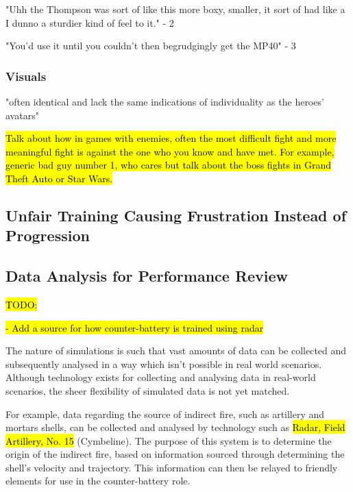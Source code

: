 \documentclass{article}
\begin{document}
"Uhh the Thompson was sort of like this more boxy, smaller, it sort of had like a I dunno a sturdier kind of feel to it." - 2

"You'd use it until you couldn't then begrudgingly get the MP40" - 3

\subsubsection{Visuals}

"often identical and lack the same indications of individuality as
the heroes’ avatars"

\hl{Talk about how in games with enemies, often the most difficult fight and more meaningful fight is against the one who you know and have met.
For example, generic bad guy number 1, who cares but talk about the boss fights in Grand Theft Auto or Star Wars.}



\subsection{Unfair Training Causing Frustration Instead of Progression}


\subsection{Data Analysis for Performance Review}

\hl{TODO:} 

\hl{- Add a source for how counter-battery is trained using radar}

The nature of simulations is such that vast amounts of data can be collected and subsequently analysed in a way which isn't possible in real world scenarios. Although technology exists for collecting and analysing data in real-world scenarios, the sheer flexibility of simulated data is not yet matched.

For example, data regarding the source of indirect fire, such as artillery and mortars shells, can be collected and analysed by technology such as \hl{Radar, Field Artillery, No. 15} (Cymbeline). The purpose of this system is to determine the origin of the indirect fire, based on information sourced through determining the shell's velocity and trajectory. This information can then be relayed to friendly elements for use in the counter-battery role.
\end{document}
